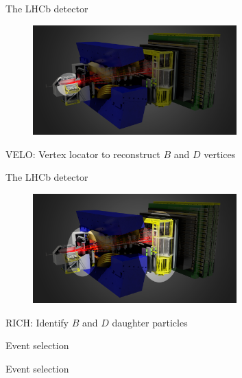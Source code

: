 \documentclass{beamer}
\begin{document}
\begin{frame}{The LHCb detector}
  \begin{figure}
    \centering
    \includegraphics[width = 0.7\textwidth]{Plots/LHCbDetector_VELO.png}
  \end{figure}
  \begin{center}
    \Large VELO: Vertex locator to reconstruct $B$ and $D$ vertices
  \end{center}
\end{frame}

\begin{frame}{The LHCb detector}
  \begin{figure}
    \centering
    \includegraphics[width = 0.7\textwidth]{Plots/LHCbDetector_RICH.png}
  \end{figure}
  \begin{center}
    \Large RICH: Identify $B$ and $D$ daughter particles
  \end{center}
\end{frame}

\begin{frame}{Event selection}
  \begin{center}
    {\huge Event selection}
  \end{center}
\end{frame}
\end{document}
